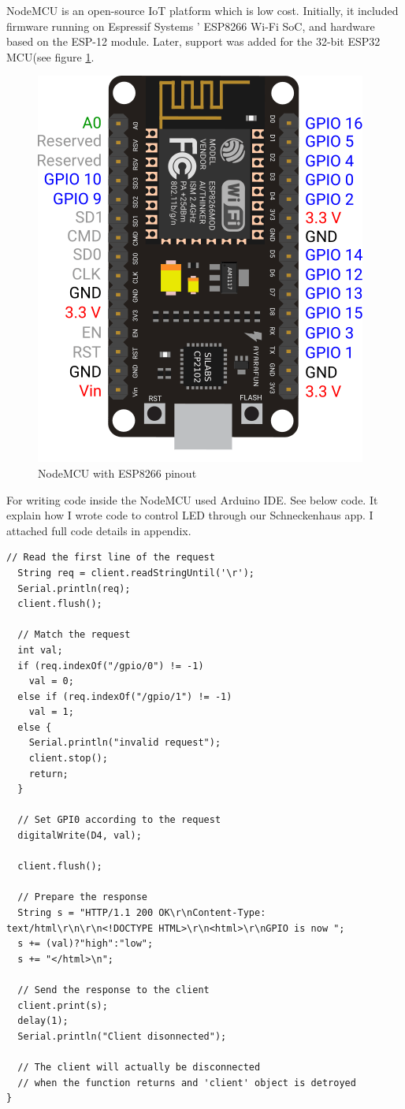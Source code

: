 NodeMCU is an open-source \acs{IoT} platform which is low cost. Initially, it included firmware running on Espressif Systems ' ESP8266 Wi-Fi SoC, and hardware based on the ESP-12 module. Later, support was added for the 32-bit ESP32 MCU(see figure \ref{fig:node}.
\begin{figure}[hbt!] 
  \centering
  \includegraphics[width=0.5\linewidth]{chap4/image4/Node.png}
  \caption[NodeMCU with ESP8266 pinout ]{NodeMCU with ESP8266 pinout}
  \label{fig:node}
\end{figure}
For writing code inside the NodeMCU used Arduino IDE. See below code. It explain how I wrote code to control LED through our Schneckenhaus app. I attached full code details in appendix. 

\begin{lstlisting}
// Read the first line of the request
  String req = client.readStringUntil('\r');
  Serial.println(req);
  client.flush();
  
  // Match the request
  int val;
  if (req.indexOf("/gpio/0") != -1)
    val = 0;
  else if (req.indexOf("/gpio/1") != -1)
    val = 1;
  else {
    Serial.println("invalid request");
    client.stop();
    return;
  }

  // Set GPI0 according to the request
  digitalWrite(D4, val);
  
  client.flush();

  // Prepare the response
  String s = "HTTP/1.1 200 OK\r\nContent-Type: text/html\r\n\r\n<!DOCTYPE HTML>\r\n<html>\r\nGPIO is now ";
  s += (val)?"high":"low";
  s += "</html>\n";

  // Send the response to the client
  client.print(s);
  delay(1);
  Serial.println("Client disonnected");

  // The client will actually be disconnected 
  // when the function returns and 'client' object is detroyed
}
\end{lstlisting}

